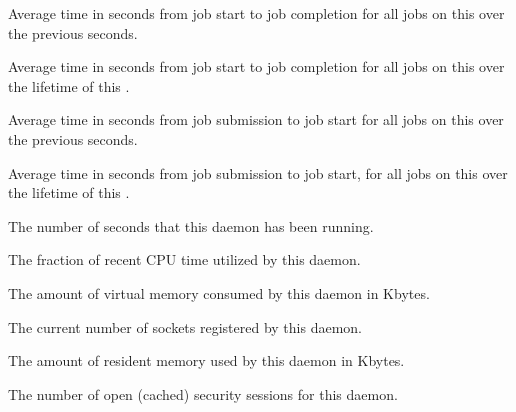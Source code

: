\begin{description}
\item[\AdAttr{MeanRunningTime}:] Average time in seconds
  from job start to job completion for all jobs
  on this  over the previous  seconds.

\item[\AdAttr{MeanRunningTimeCumulative}:] Average time in seconds
  from job start to job completion for all jobs
  on this  over the lifetime of this .

\item[\AdAttr{MeanTimeToStart}:] Average time in seconds
  from job submission to job start for all jobs
  on this  over the previous  seconds.

\item[\AdAttr{MeanTimeToStartCumulative}:] Average time in seconds 
  from job submission to job start, 
  for all jobs on this  over the 
  lifetime of this .

\item[\AdAttr{MonitorSelfAge}:] The number of seconds that this daemon
  has been running.

\item[\AdAttr{MonitorSelfCPUUsage}:] The fraction of recent CPU time utilized
  by this daemon. 

\item[\AdAttr{MonitorSelfImageSize}:] The amount of virtual memory consumed by
  this daemon in Kbytes.

\item[\AdAttr{MonitorSelfRegisteredSocketCount}:] The current number of sockets
  registered by this daemon.

\item[\AdAttr{MonitorSelfResidentSetSize}:] The amount of resident memory
  used by this daemon in Kbytes.

\item[\AdAttr{MonitorSelfSecuritySessions}:] The number of open (cached)
  security sessions for this daemon.


\end{description}

